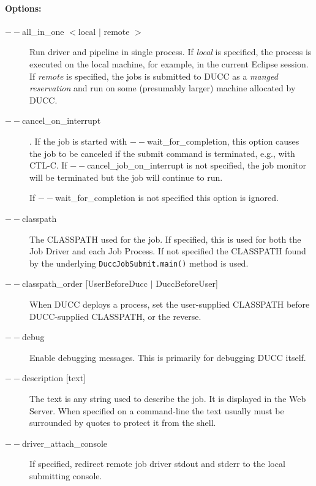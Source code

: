         \paragraph{Options:}
           \begin{description}

           \item[$--$all\_in\_one $<$local $|$ remote $>$]
               Run driver and pipeline in single process.  If {\em local} is specified, the
               process is executed on the local machine, for example, in the current Eclipse session.
               If {\em remote} is specified, the jobs is submitted to DUCC as a {\em manged reservation}
               and run on some (presumably larger) machine allocated by DUCC.

           \item[$--$cancel\_on\_interrupt].  If the job is started with $--$wait\_for\_completion, this
             option causes the job to be canceled if the submit command is terminated,
             e.g., with CTL-C. If $--$cancel\_job\_on\_interrupt is not
             specified, the job monitor will be terminated but the job will continue to run.

             If $--$wait\_for\_completion is not specified this option is ignored. 

           \item[$--$classpath] The CLASSPATH used for the job.  If specified, this is used
             for both the Job Driver and each Job Process. If not specified the CLASSPATH found by the underlying
             {\tt DuccJobSubmit.main()} method is used.

           \item[$--$classpath\_order {[UserBeforeDucc $|$ DuccBeforeUser]} ]
             When DUCC deploys a process, set the user-supplied CLASSPATH before DUCC-supplied
             CLASSPATH, or the reverse.
             
           \item[$--$debug] Enable debugging messages. This is primarily for debugging DUCC itself.

           \item[$--$description {[text]}] The text is any string used to describe the job. It is
             displayed in the Web Server. When specified on a command-line the text usually 
             must be surrounded by quotes to protect it from the shell.

           \item[$--$driver\_attach\_console] If specified, redirect remote job driver stdout and stderr
             to the local submitting console.


\end{description}

